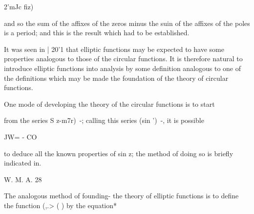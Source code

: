 2'mJc fiz)

and so the sum of the affixes of the zeros minus the suin of the
affixes of the poles is a period; and this is the result which had to
be established.


It was seen in | 20'1 that elliptic functions may be expected to have
some properties analogous to those of the circular functions. It is
therefore natural to introduce elliptic functions into analysis by
some definition analogous to one of the definitions which may be made
the foundation of the theory of circular functions.

One mode of developing the theory of the circular functions is to
start

from the series S z-m7r)~-; calling this series (sin ')~-, it is
possible

JW= - CO

to deduce all the known properties of sin z; the method of doing so
is briefly indicated in.

W. M. A. 28

%
%

The analogous method of founding- the theory of elliptic functions is
to define the function (,.> ( ) by the equation*

